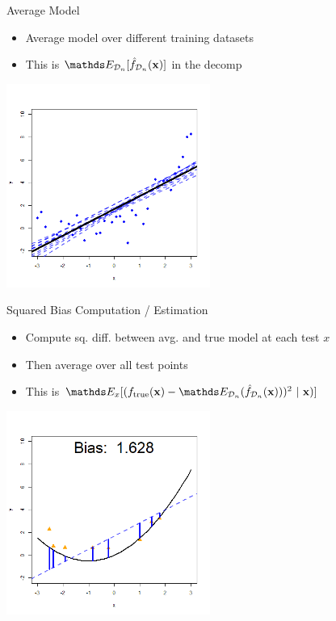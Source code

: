 \documentclass[11pt,compress,t,notes=noshow, xcolor=table]{beamer}
\begin{document}
\begin{vbframe} {Average Model}

\begin{itemize}
\item Average model over different training datasets
\item This is $\E_{\D_n}[\fh_{\D_n}(\xv)]$ in the decomp
\end{itemize}

\begin{center}
  \includegraphics[width = 0.5\textwidth]{figure/bias_variance_decomposition-linear_model.png}
\end{center}

\end{vbframe} 


\begin{vbframe} {Squared Bias Computation / Estimation}

\begin{itemize}
\item Compute sq. diff. between avg. and true model at each test $x$
\item Then average over all test points
\item This is 
$ 
\E_x[ ( \ftrue(\xv)-\E_{\D_n} (\fh_{\D_n}(\xv) ))^2~|~\xv ) ]
$
\end{itemize}

\begin{center}
  \includegraphics[width = 0.5\textwidth]{figure/bias_variance_decomposition-linear_model_bias.png}
\end{center}

\end{vbframe} 
\end{document}
